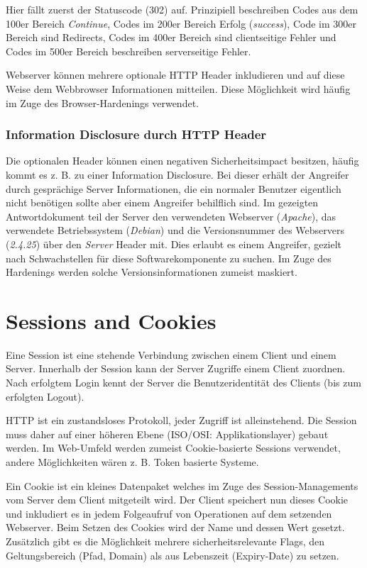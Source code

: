 Hier fällt zuerst der Statuscode (302) auf. Prinzipiell beschreiben Codes aus dem 100er Bereich \textit{Continue}, Codes im 200er Bereich Erfolg (\textit{success}), Code im 300er Bereich sind Redirects, Codes im 400er Bereich sind clientseitige Fehler und Codes im 500er Bereich beschreiben serverseitige Fehler.

Webserver können mehrere optionale HTTP Header inkludieren und auf diese Weise dem Webbrowser Informationen mitteilen. Diese Möglichkeit wird häufig im Zuge des Browser-Hardenings verwendet.

\subsubsection{Information Disclosure durch HTTP Header}

Die optionalen Header können einen negativen Sicherheitsimpact besitzen, häufig kommt es z. B. zu einer Information Disclosure. Bei dieser erhält der Angreifer durch gesprächige Server Informationen, die ein normaler Benutzer eigentlich nicht benötigen sollte aber einem Angreifer behilflich sind. Im gezeigten Antwortdokument teil der Server den verwendeten Webserver (\textit{Apache}), das verwendete Betriebssystem (\textit{Debian}) und die Versionsnummer des Webservers (\textit{2.4.25}) über den \textit{Server} Header mit. Dies erlaubt es einem Angreifer, gezielt nach Schwachstellen für diese Softwarekomponente zu suchen. Im Zuge des Hardenings werden solche Versionsinformationen zumeist maskiert.

\section{Sessions and Cookies}

Eine Session ist eine stehende Verbindung zwischen einem Client und einem Server. Innerhalb der Session kann der Server Zugriffe einem Client zuordnen. Nach erfolgtem Login kennt der Server die Benutzeridentität des Clients (bis zum erfolgten Logout).

HTTP ist ein zustandsloses Protokoll, jeder Zugriff ist alleinstehend. Die Session muss daher auf einer höheren Ebene (ISO/OSI: Applikationslayer) gebaut werden. Im Web-Umfeld werden zumeist Cookie-basierte Sessions verwendet, andere Möglichkeiten wären z. B. Token basierte Systeme.

Ein Cookie ist ein kleines Datenpaket welches im Zuge des Session-Managements vom Server dem Client mitgeteilt wird. Der Client speichert nun dieses Cookie und inkludiert es in jedem Folgeaufruf von Operationen auf dem setzenden Webserver. Beim Setzen des Cookies wird der Name und dessen Wert gesetzt. Zusätzlich gibt es die Möglichkeit mehrere sicherheitsrelevante Flags, den Geltungsbereich (Pfad, Domain) als aus Lebenszeit (Expiry-Date) zu setzen.

